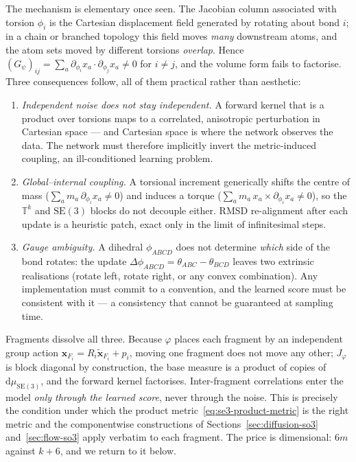 \documentclass[a4paper,12pt]{article}
\theoremstyle{remark}
\begin{document}
The mechanism is elementary once seen. The Jacobian column associated with torsion $\phi_i$ is the
Cartesian displacement field generated by rotating about bond $i$; in a chain or branched topology
this field moves \emph{many} downstream atoms, and the atom sets moved by different torsions
\emph{overlap}. Hence $(G_\psi)_{ij} = \sum_a \partial_{\phi_i} x_a \cdot \partial_{\phi_j} x_a \neq 0$
for $i \neq j$, and the volume form fails to factorise. Three consequences follow, all of them
practical rather than aesthetic:

\begin{enumerate}
\item \emph{Independent noise does not stay independent.} A forward kernel that is a product over
      torsions maps to a correlated, anisotropic perturbation in Cartesian space --- and Cartesian
      space is where the network observes the data. The network must therefore implicitly invert
      the metric-induced coupling, an ill-conditioned learning problem.
\item \emph{Global--internal coupling.} A torsional increment generically shifts the centre of mass
      ($\sum_a m_a\, \partial_{\phi_i} x_a \neq 0$) and induces a torque
      ($\sum_a m_a\, x_a \times \partial_{\phi_i} x_a \neq 0$), so the $\mathbb{T}^k$ and
      $\mathrm{SE}(3)$ blocks do not decouple either. RMSD re-alignment after each update is a
      heuristic patch, exact only in the limit of infinitesimal steps.
\item \emph{Gauge ambiguity.} A dihedral $\phi_{ABCD}$ does not determine \emph{which} side of the
      bond rotates: the update $\Delta\phi_{ABCD} = \theta_{ABC} - \theta_{BCD}$ leaves two extrinsic
      realisations (rotate left, rotate right, or any convex combination). Any implementation must
      commit to a convention, and the learned score must be consistent with it --- a consistency that
      cannot be guaranteed at sampling time.
\end{enumerate}

Fragments dissolve all three. Because $\varphi$ places each fragment by an independent group action
$\mathbf{x}_{F_i} = R_i \tilde{\mathbf{x}}_{F_i} + p_i$, moving one fragment does not move any other;
$J_\varphi$ is block diagonal by construction, the base measure is a product of copies of
$\mathrm{d}\mu_{\mathrm{SE}(3)}$, and the forward kernel factorises. Inter-fragment correlations
enter the model \emph{only through the learned score}, never through the noise. This is precisely
the condition under which the product metric~\eqref{eq:se3-product-metric} is the right metric and
the componentwise constructions of Sections~\ref{sec:diffusion-so3} and~\ref{sec:flow-so3} apply
verbatim to each fragment. The price is dimensional: $6m$ against $k+6$, and we return to it below.
\end{document}
